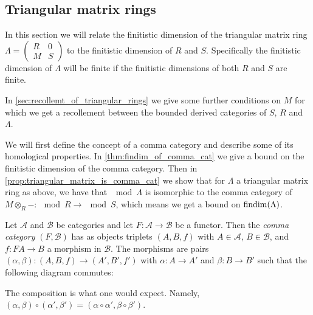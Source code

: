 \subsection{Triangular matrix rings}\label{sec:Triangular_matrix_rings}

In this section we will relate the finitistic dimension of the triangular matrix ring $\Lambda = \begin{pmatrix}
R & 0\\
M& S
\end{pmatrix}$ to the finitistic dimension of $R$ and $S$. Specifically the finitistic dimension of $\Lambda$ will be finite if the finitistic dimensions of both $R$ and $S$ are finite. 

In \cref{sec:recollemt_of_triangular_rings} we give some further conditions on $M$ for which we get a recollement between the bounded derived categories of $S$, $R$ and $\Lambda$.

We will first define the concept of a comma category and describe some of its homological properties. In \cref{thm:findim_of_comma_cat} we give a bound on the finitistic dimension of the comma category. Then in \cref{prop:triangular_matrix_is_comma_cat} we show that for $\Lambda$ a triangular matrix ring as above, we have that $\mod \Lambda$ is isomorphic to the comma category of $M\otimes_R - \colon \mod R \to \mod S$, which means we get a bound on $\operatorname{findim}(\Lambda)$.

\begin{defn}
	Let $\mathcal A$ and $\mathcal B$ be categories and let $F\colon\mathcal A \to \mathcal B$ be a functor. Then the \emph{comma category} $(F, \mathcal  B)$ has as objects triplets $(A, B, f)$ with $A \in \mathcal  A$, $B \in \mathcal  B$, and $f\colon FA \to B$ a morphism in $\mathcal  B$. The morphisms are pairs $(\alpha, \beta)\colon(A, B, f) \to (A', B', f')$ with $\alpha\colon A \to A'$ and $\beta\colon B \to B'$ such that the following diagram commutes:
	\begin{center}
	\end{center}
	The composition is what one would expect. Namely, $(\alpha, \beta) \circ (\alpha', \beta') = (\alpha \circ \alpha ', \beta \circ \beta')$.
\end{defn}

